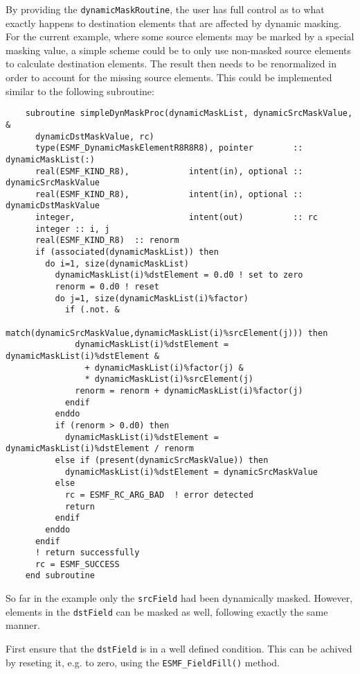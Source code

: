    By providing the {\tt dynamicMaskRoutine}, the user has full control as to
   what exactly happens to destination elements that are affected by dynamic
   masking. For the current example, where some source elements may be marked by
   a special masking value, a simple scheme could be to only use non-masked
   source elements to calculate destination elements. The result then needs to
   be renormalized in order to account for the missing source elements. This
   could be implemented similar to the following subroutine:
  
   \begin{verbatim}
    subroutine simpleDynMaskProc(dynamicMaskList, dynamicSrcMaskValue, &
      dynamicDstMaskValue, rc)
      type(ESMF_DynamicMaskElementR8R8R8), pointer        :: dynamicMaskList(:)
      real(ESMF_KIND_R8),            intent(in), optional :: dynamicSrcMaskValue
      real(ESMF_KIND_R8),            intent(in), optional :: dynamicDstMaskValue
      integer,                       intent(out)          :: rc
      integer :: i, j
      real(ESMF_KIND_R8)  :: renorm
      if (associated(dynamicMaskList)) then
        do i=1, size(dynamicMaskList)
          dynamicMaskList(i)%dstElement = 0.d0 ! set to zero
          renorm = 0.d0 ! reset
          do j=1, size(dynamicMaskList(i)%factor)
            if (.not. &
              match(dynamicSrcMaskValue,dynamicMaskList(i)%srcElement(j))) then
              dynamicMaskList(i)%dstElement = dynamicMaskList(i)%dstElement &
                + dynamicMaskList(i)%factor(j) &
                * dynamicMaskList(i)%srcElement(j)
              renorm = renorm + dynamicMaskList(i)%factor(j)
            endif
          enddo
          if (renorm > 0.d0) then
            dynamicMaskList(i)%dstElement = dynamicMaskList(i)%dstElement / renorm
          else if (present(dynamicSrcMaskValue)) then
            dynamicMaskList(i)%dstElement = dynamicSrcMaskValue
          else
            rc = ESMF_RC_ARG_BAD  ! error detected
            return
          endif
        enddo
      endif
      ! return successfully
      rc = ESMF_SUCCESS
    end subroutine
   \end{verbatim}
  
   So far in the example only the {\tt srcField} had been dynamically masked.
   However, elements in the {\tt dstField} can be masked as well, following 
   exactly the same manner.
  
   First ensure that the {\tt dstField} is in a well defined condition. This can
   be achived by reseting it, e.g. to zero, using the {\tt ESMF\_FieldFill()}
   method. 


